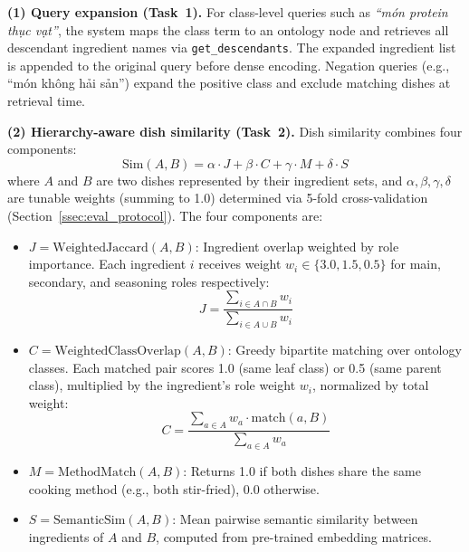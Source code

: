 \textbf{(1) Query expansion (Task~1).}
For class-level queries such as \textit{``m\'{o}n protein th\d{u}c v\d{a}t''}, the system maps the class term to an ontology node and retrieves all descendant ingredient names via \texttt{get\_descendants}. The expanded ingredient list is appended to the original query before dense encoding. Negation queries (e.g., ``m\'{o}n kh\^{o}ng h\h{a}i s\h{a}n'') expand the positive class and exclude matching dishes at retrieval time.

\textbf{(2) Hierarchy-aware dish similarity (Task~2).}
Dish similarity combines four components:
%
\begin{equation}
\label{eq:sim}
\text{Sim}(A, B) = \alpha \cdot J + \beta \cdot C + \gamma \cdot M + \delta \cdot S
\end{equation}
%
where $A$ and $B$ are two dishes represented by their ingredient sets, and $\alpha, \beta, \gamma, \delta$ are tunable weights (summing to 1.0) determined via 5-fold cross-validation (Section~\ref{ssec:eval_protocol}). The four components are:

\begin{itemize}
  \item $J = \text{WeightedJaccard}(A, B)$: Ingredient overlap weighted by role importance. Each ingredient $i$ receives weight $w_i \in \{3.0, 1.5, 0.5\}$ for main, secondary, and seasoning roles respectively:
  \[
    J = \frac{\sum_{i \in A \cap B} w_i}{\sum_{i \in A \cup B} w_i}
  \]

  \item $C = \text{WeightedClassOverlap}(A, B)$: Greedy bipartite matching over ontology classes. Each matched pair scores 1.0 (same leaf class) or 0.5 (same parent class), multiplied by the ingredient's role weight $w_i$, normalized by total weight:
  \[
    C = \frac{\sum_{a \in A} w_a \cdot \text{match}(a, B)}{\sum_{a \in A} w_a}
  \]

  \item $M = \text{MethodMatch}(A, B)$: Returns 1.0 if both dishes share the same cooking method (e.g., both stir-fried), 0.0 otherwise.

  \item $S = \text{SemanticSim}(A, B)$: Mean pairwise semantic similarity between ingredients of $A$ and $B$, computed from pre-trained embedding matrices.
\end{itemize}
